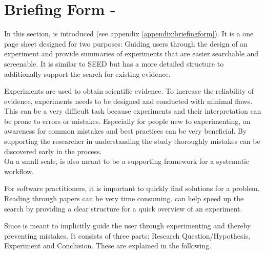 
\section{Briefing Form - \briefingform}
\label{sec:briefing form}

In this section, \textit{\briefingform} is introduced (see appendix \ref{appendix:briefingform}). It is a one page sheet designed for two purposes: Guiding users through the design of an experiment and provide summaries of experiments that are easier searchable and screenable. It is similar to SEED but has a more detailed structure to additionally support the search for existing evidence.

Experiments are used to obtain scientific evidence. To increase the reliability of evidence, experiments needs to be designed and conducted with minimal flaws. This can be a very difficult task because experiments and their interpretation can be prone to errors or mistakes. Especially for people new to experimenting, an awareness for common mistakes and best practices can be very beneficial. By supporting the researcher in understanding the study thoroughly mistakes can be discovered early in the process.\\
On a small scale, \briefingform is also meant to be a  supporting framework for a systematic workflow.

For software practitioners, it is important to quickly find solutions for a problem. Reading through papers can be very time consuming. \briefingform can help speed up the search by providing a clear structure for a quick overview of an experiment.

Since \briefingform is meant to implicitly guide the user through experimenting and thereby preventing mistakes. It consists of three parts: Research Question/Hypothesis, Experiment and Conclusion. These are explained in the following.